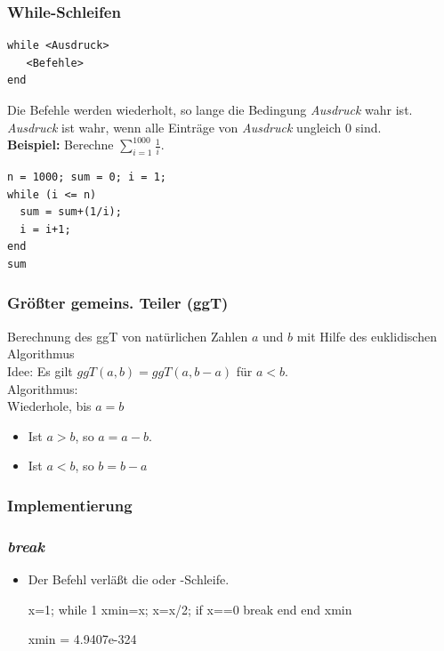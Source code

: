 \documentclass[hyperref={xetex}]{beamer}
\begin{document}
%
%
%
\begin{frame}[fragile]\frametitle{While-Schleifen}
\begin{lstlisting}
while <Ausdruck>
   <Befehle>
end
\end{lstlisting}
Die Befehle werden wiederholt,  so lange die Bedingung {\it Ausdruck}
wahr ist.  {\it Ausdruck} ist wahr, wenn   alle Einträge von {\it
  Ausdruck} ungleich $0$ sind. \\[1cm] 

\textbf{Beispiel:} Berechne \alert{ $\sum_{i=1}^{1000} \frac{1}{i}$}.
\begin{lstlisting}
n = 1000; sum = 0; i = 1; 
while (i <= n) 
  sum = sum+(1/i); 
  i = i+1;  
end
sum
\end{lstlisting}

\end{frame}
%
%
%
\begin{frame}[fragile]\frametitle{Größter gemeins. Teiler (ggT)}
Berechnung des ggT von natürlichen Zahlen $a$ und $b$ mit Hilfe des
euklidischen Algorithmus\\[1cm]

\alert{Idee:} Es gilt \alert{ $ggT(a,b)=ggT(a,b-a)$} für $a<b$.\\[1cm]

\alert{Algorithmus:} \\
Wiederhole,  bis $a=b$
\begin{itemize}
\item Ist $a>b$, so $a=a-b$.
\item Ist $a<b$, so $b=b-a$ 
\end{itemize}
\end{frame}

\begin{frame}[fragile]\frametitle{Implementierung}

\end{frame}
%
%
%
\begin{frame}[fragile]\frametitle{\textit{break}}
\begin{itemize}
\item  Der Befehl  verläßt die  oder
  -Schleife.
\begin{matlabin}
x=1;
while 1
  xmin=x;
  x=x/2;
  if x==0
    break
  end
end
xmin
\end{matlabin}
\begin{matlab}
xmin = 4.9407e-324
\end{matlab} 

\end{itemize}
\end{frame}
\end{document}

